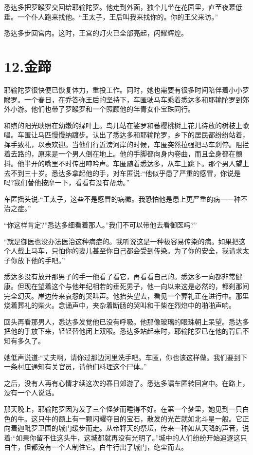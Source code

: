 \documentclass[12pt,twoside,openany]{book}
\begin{document}
悉达多把罗睺罗交回给耶输陀罗。他走到外面，独个儿坐在花园里，直至夜幕低垂。一个仆人跑来找他。“王太子，王后叫我来找你的。你的王父来访。”

悉达多步回宫内。这时，王宫的灯火已全部亮起，闪耀辉煌。

\chapter{12.金蹄}\label{ch12}

耶输陀罗很快便已恢复体力，重投工作。同时，她也需要有很多时间陪伴着小小罗睺罗。一个春日，在乔答弥王后的坚持下，车匿驶马车乘着悉达多和耶输陀罗到郊外小游。他们也带了罗睺罗和一个照顾他的年青女仆宝珠同行。

和煦的阳光映照在幼嫩的绿叶上。鸟儿站在娑罗和蕃樱桃树上花儿待放的树枝上歌唱。车匿让马匹慢慢纳踱步。认出了悉达多和耶输陀罗，乡下的居民都纷纷站着，挥手致礼，以表欢迎。当他们行近滂河岸的时候，车匿突然拉强把马车刹停。阻拦着去路的，原来是一个男人倒在地上。他的手脚都向身内卷曲，而且全身都在颤抖。他半开的嘴里不时传出呻吟声。车匿随着悉达多，从车上跳下。那个男人望上去不到三十岁。悉达多拿起他的手，对车匿说:“他似乎患了严重的感冒，你说是吗?我们替他按摩一下，看看有没有帮助。”

车匿摇头说:“王太子，这些不是感冒的病徵。我恐怕他是患上更严重的病一一种不治之症。”

“你这样肯定?”悉达多细看着那人。”我们不可以带他去看御医吗?”

“就是御医也没办法医治这种病症的。我听说这是一种极容易传染的病。如果把这个人载上马车，只怕你的妻儿甚至你自己都会受到传染。为了你的安全，我请求太子你放下他的手吧。”

悉达多没有放开那男子的手一他看了看它，再看看自己的。悉达多一向都非常健康。但现在望着这个与他年纪相若的垂死男子，他一向以来这是必然的，都刹那间完全幻灭。岸边传来哀怨的哭叫声。他抬头望去，看见一个葬礼正在进行中。那里烧着葬礼的柴火。念诵声中，夹杂着断肠的哭叫和干柴在烈焰中的啪啪声响。

回头再看那男人，悉达多发觉他已没有呼吸。他那像玻璃的眼珠朝上呆望。悉达多把他的手放下来，轻轻替他闭上双眼。悉达多站起来时，耶输陀罗已在他的背后不知有多久了。

她低声说道:“丈夫啊，请你过那边河里洗手吧。车匿，你也该这样做。我们要到下一条村庄通知有关官员，请他们料理这个尸体。”

之后，没有人再有心情才续这次的春日郊游了。悉达多嘱车匿转回宫中。在路上，没有一个人说话。

那天晚上，耶输陀罗因为发了三个怪梦而睡得不好。在第一个梦里，她见到一只白色的牛。这只牛的额上有一颗闪耀夺目的宝石，散发的光芒就如北斗星一般。它正向着迦毗罗卫国的城门缓步而走。从帝释天的祭坛，传来一种如从天降的声音，说着:“如果你留不住这头牛，这城都就再没有光明了。”城中的人们纷纷开始追逐这只白牛，但都没有一个人制住它。白牛行出了城门，绝尘而去。
\end{document}
